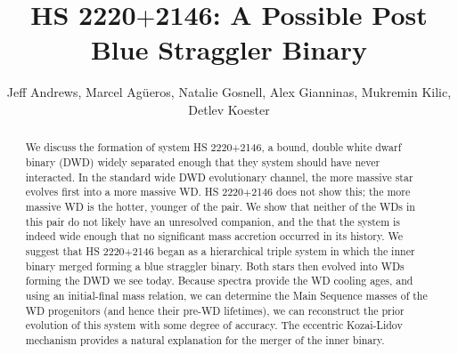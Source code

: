 \documentclass{emulateapj}
\begin{document}
\title{HS 2220$+$2146: A Possible Post Blue Straggler Binary}

\author{
Jeff Andrews,  
Marcel Ag\"ueros,
Natalie Gosnell,
Alex Gianninas,
Mukremin Kilic,
Detlev Koester
}


\begin{abstract}
We discuss the formation of system HS 2220$+$2146, a bound, double white dwarf binary (DWD) widely separated enough that they system should have never interacted. In the standard wide DWD evolutionary channel, the more massive star evolves first into a more massive WD. HS 2220$+$2146 does not show this; the more massive WD is the hotter, younger of the pair. We show that neither of the WDs in this pair do not likely have an unresolved companion, and the that the system is indeed wide enough that no significant mass accretion occurred in its history. We suggest that HS 2220$+$2146 began as a hierarchical triple system in which the inner binary merged forming a blue straggler binary. Both stars then evolved into WDs forming the DWD we see today. Because spectra provide the WD cooling ages, and using an initial-final mass relation, we can determine the Main Sequence masses of the WD progenitors (and hence their pre-WD lifetimes), we can reconstruct the prior evolution of this system with some degree of accuracy. The eccentric Kozai-Lidov mechanism provides a natural explanation for the merger of the inner binary.
\end{abstract}






\end{document}
